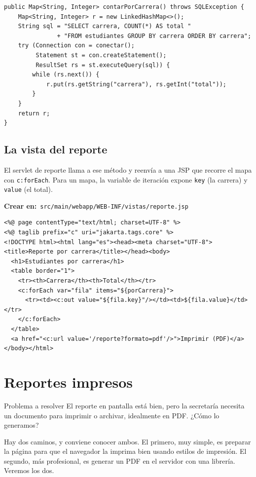 \documentclass[11pt]{article}
\begin{document}
\begin{cajacodigo}
\begin{lstlisting}[style=java]
public Map<String, Integer> contarPorCarrera() throws SQLException {
    Map<String, Integer> r = new LinkedHashMap<>();
    String sql = "SELECT carrera, COUNT(*) AS total "
               + "FROM estudiantes GROUP BY carrera ORDER BY carrera";
    try (Connection con = conectar();
         Statement st = con.createStatement();
         ResultSet rs = st.executeQuery(sql)) {
        while (rs.next()) {
            r.put(rs.getString("carrera"), rs.getInt("total"));
        }
    }
    return r;
}
\end{lstlisting}
\end{cajacodigo}
\vspace{2pt}
\subsection{La vista del reporte}
El servlet de reporte llama a ese método y reenvía a una JSP que recorre el mapa con \texttt{c:\allowbreak{}for\allowbreak{}Each}. Para un mapa, la variable de iteración expone \texttt{key} (la carrera) y \texttt{value} (el total).

{\small\color{jwebazulo}\textbf{Crear en:}~}\texttt{src/\allowbreak{}main/\allowbreak{}webapp/\allowbreak{}WEB-INF/\allowbreak{}vistas/\allowbreak{}reporte.\allowbreak{}jsp}\par\nobreak\vspace{-1pt}
\begin{cajacodigo}
\begin{lstlisting}[style=markup]
<%@ page contentType="text/html; charset=UTF-8" %>
<%@ taglib prefix="c" uri="jakarta.tags.core" %>
<!DOCTYPE html><html lang="es"><head><meta charset="UTF-8">
<title>Reporte por carrera</title></head><body>
  <h1>Estudiantes por carrera</h1>
  <table border="1">
    <tr><th>Carrera</th><th>Total</th></tr>
    <c:forEach var="fila" items="${porCarrera}">
      <tr><td><c:out value="${fila.key}"/></td><td>${fila.value}</td></tr>
    </c:forEach>
  </table>
  <a href="<c:url value='/reporte?formato=pdf'/>">Imprimir (PDF)</a>
</body></html>
\end{lstlisting}
\end{cajacodigo}
\vspace{2pt}
\section{Reportes impresos}
\begin{cajaproblema}{Problema a resolver}
El reporte en pantalla está bien, pero la secretaría necesita un documento para imprimir o archivar, idealmente en PDF. ¿Cómo lo generamos?\par
\end{cajaproblema}
Hay dos caminos, y conviene conocer ambos. El primero, muy simple, es preparar la página para que el navegador la imprima bien usando estilos de impresión. El segundo, más profesional, es generar un PDF en el servidor con una librería. Veremos los dos.
\end{document}
